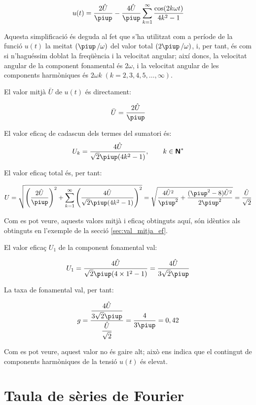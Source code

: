 \begin{exemple}[\ValorMitjaEfTaxaFon{}]
    \[
    u(t) = \frac{2\hat{U}}{\piup} - \frac{4\hat{U}}{\piup} \sum_{k=1}^\infty
          \frac{\cos(2 k \omega t)}{4k^2-1}
    \]

    Aquesta simplificació és deguda al fet que s'ha utilitzat com a
    període de la funció $u(t)$ la meitat $(\piup\,/\omega)$ del valor total
    $(2\piup\,/\omega)$, i, per tant, és com si n'haguéssim doblat la
    freqüència i la velocitat angular; així doncs, la velocitat angular
    de la component fonamental és $2\omega$, i la velocitat angular de
    les components harmòniques és $2\omega k \;(k=2,3,4,5,\ldots,\infty)$.

    El valor mitjà $\bar{U}$ de $u(t)$ és directament:

    \[
        \bar{U} = \frac{2\hat{U}}{\piup}
    \]

    El valor eficaç de cadascun dels termes del sumatori és:
    \[
        U_k =\frac{4\hat{U}}{\sqrt{2}\piup(4k^2-1)},
        \qquad k \in \mathsfb{N}^*
    \]

    El valor eficaç total és, per tant:

    \[
        U=\sqrt{\left(\frac{2\hat{U}}{\piup}\right)^2 + \sum_{k=1}^\infty
        \left(\frac{4\hat{U}}{\sqrt{2}\piup(4k^2-1)}\right)^2} =
        \sqrt{\frac{4\hat{U}^2}{\piup^2} + \frac{(\piup^2-8)\hat{U}^2}{2\piup^2}
        }= \frac{\hat{U}}{\sqrt{2}}
    \]

    Com es pot veure, aquests valors mitjà i eficaç obtinguts aquí, són
    idèntics als obtinguts en l'exemple de la secció
    \ref{sec:val_mitja_ef}.

    El valor eficaç $U_1$ de la component fonamental val:

    \[
        U_1 =\frac{4\hat{U}}{\sqrt{2}\piup(4\times 1^2-1)} =
        \frac{4\hat{U}}{3\sqrt{2}\piup}
    \]

    La taxa de fonamental val, per tant:

    \[
        g =
        \frac{\dfrac{4\hat{U}}{3\sqrt{2}\piup}}{\dfrac{\hat{U}}{\sqrt{2}}}
        =\frac{4}{3\piup} = 0,{42}
    \]

    Com es pot veure, aquest valor no és gaire alt; això ens indica que
    el contingut de components harmòniques de la tensió $u(t)$ és
    elevat.
\end{exemple}


\section{Taula de sèries de Fourier}

